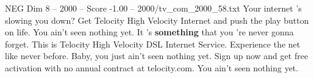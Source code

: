 \begin{textsample}{NEG Dim 8 – 2000 – Score -1.00 – 2000/tv\_com\_2000\_58.txt}  \label{ex:f8_neg_068}
Your internet 's slowing you down?
Get Telocity High Velocity Internet and push the play button on life.
You ain't seen nothing yet.
It 's \textbf{something} that you 're never gonna forget.
This is Telocity High Velocity DSL Internet Service.
Experience the net like never before.
Baby, you just ain't seen nothing yet.
Sign up now and get free activation with no annual contract at telocity.com.
You ain't seen nothing yet.

\end{textsample}
